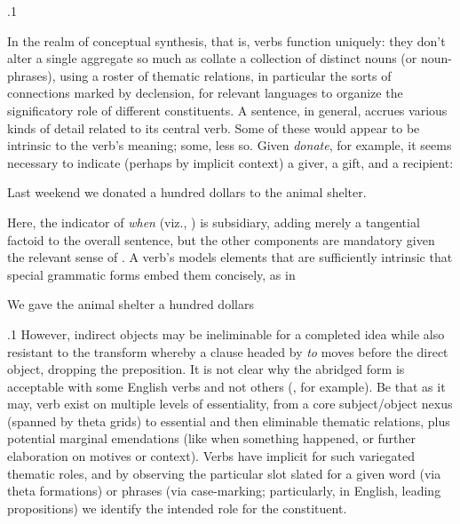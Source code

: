 \documentclass[11pt, twocolumn]{article}
\begin{document}
\p.1{%
In the realm of conceptual synthesis, that is, verbs
function uniquely: they don't alter a single aggregate so
much as collate a collection of distinct nouns
(or noun-phrases), using a roster of thematic relations,
in particular \mdash{} the sorts of connections marked
by declension, for relevant languages \mdash{} to organize
the significatory role of different constituents.
A sentence, in general, accrues various kinds of detail
related to its central verb.  Some of these
would appear to be intrinsic to the verb's meaning; some, less
so.  Given \textit{donate}, for example, it seems necessary
to indicate (perhaps by implicit context) a giver, a gift,
and a recipient:

\begin{exsGroup}

\exsItem{}   Last weekend we donated a hundred dollars to the animal shelter.

\end{exsGroup}

\nip
Here, the indicator of \textit{when} (viz., ) is subsidiary, adding merely a tangential
factoid to the overall sentence, but the other components are
mandatory given the relevant sense of .  A verb's
 models elements that are sufficiently
intrinsic that special grammatic forms embed them concisely,
as in

\begin{exsGroup}

\exsItem{}   We gave the animal shelter a hundred dollars

\end{exsGroup}

} %

\p.1{%
However, indirect objects may be ineliminable for a completed idea while
also resistant to the transform whereby a clause headed
by \textit{to} moves before the direct object, dropping the preposition.
It is not clear why the abridged  form is acceptable
with some English verbs and not others (, for example).  Be that as it may,
verb  exist on multiple levels of essentiality,
from a core subject/object nexus (spanned by theta grids) to
essential and then eliminable thematic relations, plus potential marginal
emendations (like when something happened, or further elaboration
on motives or context).  Verbs have implicit
 for such variegated thematic roles, and by observing
the particular slot slated for a given word (via theta formations)
or phrases (via case-marking; particularly, in English, leading
propositions) we identify the intended role for the constituent.
} %
\end{document}
